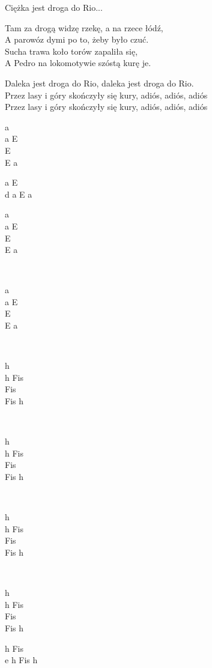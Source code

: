 \begin{text}
    \vin Ciężka jest droga do Rio...

    Tam za drogą widzę rzekę, a na rzece łódź,\\
    A parowóz dymi po to, żeby było czuć.\\
    Sucha trawa koło torów zapaliła się,\\
    A Pedro na lokomotywie szóstą kurę je.

    Daleka jest droga do Rio, daleka jest droga do Rio.\\
    Przez lasy i góry skończyły się kury, adiós, adiós, adiós\\
    Przez lasy i góry skończyły się kury, adiós, adiós, adiós
\end{text}
\begin{chord}
    a\\
    a E\\
    E\\
    E a

    a E\\
    d a E a

    a\\
    a E\\
    E\\
    E a

    ~

    a\\
    a E\\
    E\\
    E a

    ~

    h\\
    h Fis\\
    Fis\\
    Fis h

    ~

    h\\
    h Fis\\
    Fis\\
    Fis h

    ~

    h\\
    h Fis\\
    Fis\\
    Fis h

    ~

    h\\
    h Fis\\
    Fis\\
    Fis h

    h Fis\\
    e h Fis h
\end{chord}